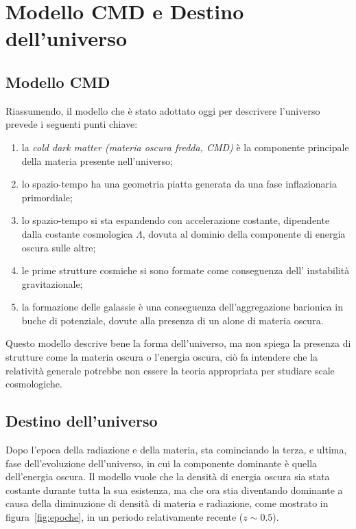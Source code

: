 \section{Modello CMD e Destino dell'universo}\label{sec:modello-CDM-destino}

\subsection{Modello CMD}\label{sec:modello-CDM}
Riassumendo, il modello che è stato adottato oggi per descrivere l'universo prevede i seguenti punti chiave:
\begin{enumerate}
    \item la \emph{cold dark matter (materia oscura fredda, CMD)} è la componente principale della materia presente nell'universo;
    \item lo spazio-tempo ha una geometria piatta generata da una fase inflazionaria primordiale;
    \item lo spazio-tempo si sta espandendo con accelerazione costante, dipendente dalla costante cosmologica $\Lambda$, dovuta al dominio della componente di energia oscura sulle altre;
    \item le prime strutture cosmiche si sono formate come conseguenza dell' instabilità gravitazionale;
    \item la formazione delle galassie è una conseguenza dell'aggregazione barionica in buche di potenziale, dovute alla presenza di un alone di materia oscura.
\end{enumerate}

Questo modello descrive bene la forma dell'universo, ma non spiega la presenza di strutture come la materia oscura o l'energia oscura, ciò fa intendere che la relatività generale potrebbe non essere la teoria appropriata per studiare scale cosmologiche.

\subsection{Destino dell'universo}\label{sec:destino}

Dopo l'epoca della radiazione e della materia, sta cominciando la terza, e ultima, fase dell'evoluzione dell'universo, in cui la componente dominante è quella dell'energia oscura. Il modello vuole che la densità di energia oscura sia stata costante durante tutta la sua esistenza, ma che ora stia diventando dominante a causa della diminuzione di densità di materia e radiazione, come mostrato in figura~\ref{fig:epoche}, in un periodo relativamente recente ($z \sim 0.5$).


